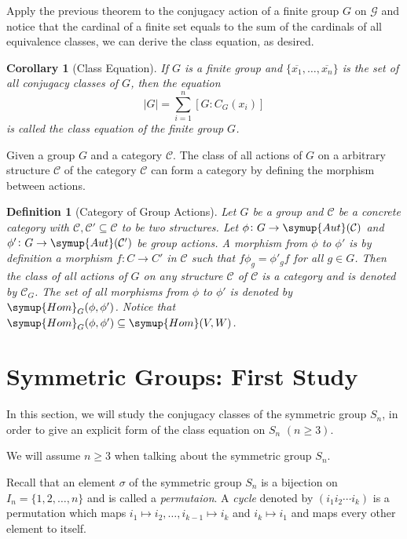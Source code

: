 \documentclass{assignment}[2019/10/15]
\theoremstyle{plain}
\newtheorem{definition}[theorem]{Definition}
\newtheorem{corollary}[theorem]{Corollary}
\newcommand{\Hom}{\mathop{}\!\symup{Hom}}
\newcommand{\Aut}{\mathop{}\!\symup{Aut}}
\begin{document}
    Apply the previous theorem to the conjugacy action of a finite group $G$ on $\mathcal{G}$ and notice that the cardinal of a finite set equals to the sum of the cardinals of all equivalence classes, we can derive the class equation, as desired.

    \begin{corollary}[Class Equation]
        If $G$ is a finite group and $\{\overline{x_1}, \dotsc, \overline{x_n}\}$ is the set of all conjugacy classes of $G$, then the equation
        \begin{equation}
            |G| = \sum_{i=1}^n[G: C_G(x_i)]
        \end{equation}
        is called the \emph{class equation} of the finite group $G$.
    \end{corollary}

    Given a group $G$ and a category $\mathscr{C}$. The class of all actions of $G$ on a arbitrary structure $\mathcal{C}$ of the category $\mathscr{C}$ can form a category by defining the morphism between actions.

    \begin{definition}[Category of Group Actions]
        Let $G$ be a group and $\mathscr{C}$ be a concrete category with $\mathcal{C}, \mathcal{C}'\subseteq \mathscr{C}$ to be two structures. Let $\phi\colon G\to \Aut(\mathcal{C})$ and $\phi'\colon G\to\Aut(\mathcal{C}')$ be group actions. A morphism from $\phi$ to $\phi'$ is by definition a morphism $f\colon C\to C'$ in $\mathscr{C}$ such that $f\phi_g = \phi'_gf$ for all $g\in G$. Then the class of all actions of $G$ on any structure $\mathcal{C}$ of $\mathscr{C}$ is a category and is denoted by $\mathscr{C}_G$. The set of all morphisms from $\phi$ to $\phi'$ is denoted by $\Hom_G(\phi, \phi')$. Notice that $\Hom_{G}(\phi, \phi')\subseteq \Hom(V, W)$.
    \end{definition}

    \section{Symmetric Groups: First Study}

    In this section, we will study the conjugacy classes of the symmetric group $S_n$, in order to give an explicit form of the class equation on $S_n$ $(n\geq 3)$.

    We will assume $n\geq 3$ when talking about the symmetric group $S_n$.

    Recall that an element $\sigma$ of the symmetric group $S_n$ is a bijection on $I_n = \{1, 2, \dotsc, n\}$ and is called a \emph{permutaion}.
    A \emph{cycle} denoted by $(i_1 i_2 \dotsb i_k)$ is a permutation which maps $i_1\mapsto i_2, \dotsc, i_{k-1}\mapsto i_k$ and $i_k\mapsto i_1$ and maps every other element to itself.
\end{document}
